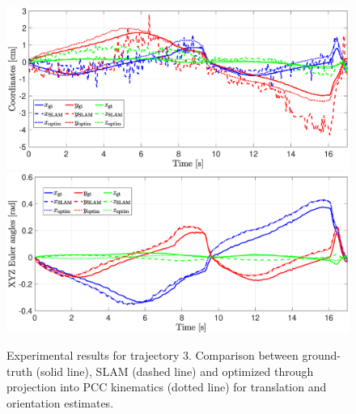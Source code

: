 \begin{figure}[ht]
    \centering
    \includegraphics[width=0.9\columnwidth, trim={2cm 1.2cm 2cm 0}]{srslam/figures/vtem28_t3_coordinates.eps}\\
    \includegraphics[width=0.9\columnwidth, trim={2cm 0 2cm 1.2cm}]{srslam/figures/vtem28_t3_angles.eps}
    \caption{ Experimental results for trajectory 3. Comparison between ground-truth (solid line), \gls{SLAM} (dashed line) and optimized through projection into \gls{PCC} kinematics (dotted line) for translation and orientation estimates.}
    \label{fig:srslam:experiments_t3_over_time}
\end{figure}

